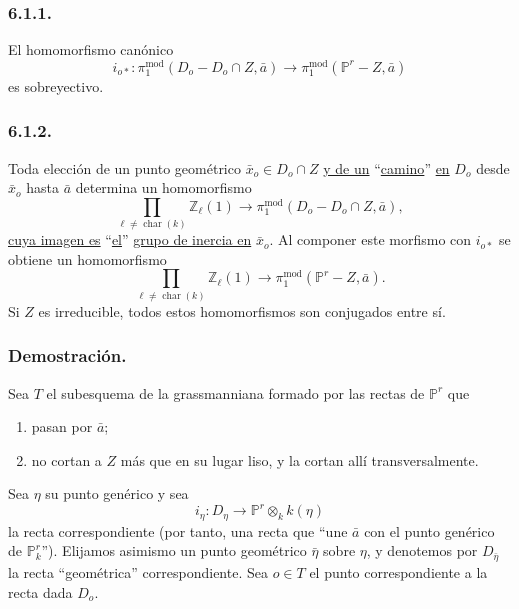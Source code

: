 \pageoriginale

\subsubsection*{6.1.1.}

El homomorfismo canónico
\begin{equation}\tag{6.1.1.1}
i_{o*}:\pi_1^{\mathrm{mod}}(D_o-D_o\cap Z,\bar a)
\longrightarrow
\pi_1^{\mathrm{mod}}(\mathbb P^r-Z,\bar a)
\end{equation}
es sobreyectivo.

\subsubsection*{6.1.2.}

Toda elección de un punto geométrico
$\bar x_o\in D_o\cap Z$ \underline{y de un} ``\underline{camino}'' \underline{en} $D_o$ desde $\bar x_o$
hasta $\bar a$ determina un homomorfismo
\begin{equation}\tag{6.1.2.1}
\prod_{\ell\ne\operatorname{char}(k)}\mathbb Z_\ell(1)
\longrightarrow
\pi_1^{\mathrm{mod}}(D_o-D_o\cap Z,\bar a),
\end{equation}
\underline{cuya imagen es} ``\underline{el}'' \underline{grupo de inercia en} $\bar x_o$. Al componer este
morfismo con $i_{o*}$ se obtiene un homomorfismo
\begin{equation}\tag{6.1.2.2}
\prod_{\ell\ne\operatorname{char}(k)}\mathbb Z_\ell(1)
\longrightarrow
\pi_1^{\mathrm{mod}}(\mathbb P^r-Z,\bar a).
\end{equation}
Si $Z$ es irreducible, todos estos homomorfismos son conjugados entre
sí.

\subsubsection*{Demostración.}

Sea $T$ el subesquema de la grassmanniana formado por las rectas de
$\mathbb P^r$ que
\begin{enumerate}[label=(\roman*)]
\item pasan por $\bar a$;
\item no cortan a $Z$ más que en su lugar liso, y la cortan allí
  transversalmente.
\end{enumerate}
Sea $\eta$ su punto genérico y sea
\[
i_\eta:D_\eta\longrightarrow\mathbb P^r\otimes_k k(\eta)
\]
la recta correspondiente (por tanto, una recta que ``une $\bar a$ con
el punto genérico de $\mathbb P^r_k$''). Elijamos asimismo un punto
geométrico $\bar\eta$ sobre $\eta$, y denotemos por $D_{\bar\eta}$ la
recta ``geométrica'' correspondiente. Sea $o\in T$ el punto
correspondiente a la recta dada $D_o$.

